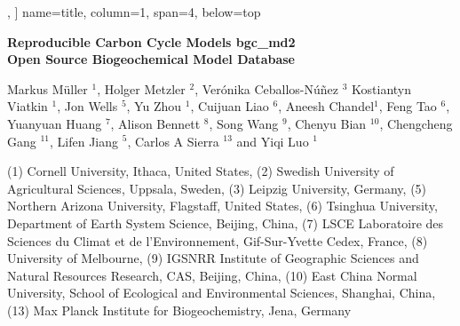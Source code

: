 \documentclass[36pt]{article}
\begin{document}
\begin{tcbposter}
{},
]{
name=title,
column=1,
span=4,
below=top}{
\resizebox*{!}{2cm}
{ \bfseries Reproducible Carbon Cycle Models bgc\_md2 }\\[6mm]
{ \bfseries Open Source Biogeochemical Model Database}\\[6mm]
\begin{minipage}{150cm}
\begin{center}
\small{
Markus Müller $^1$, 
Holger Metzler $^2$,
Ver\'onika Ceballos-N\'u\~nez $^3$
Kostiantyn Viatkin $^1$,
Jon Wells $^5$,
Yu Zhou $^1$,
Cuijuan Liao $^6$,
Aneesh Chandel$^1$,
Feng Tao $^6$,
Yuanyuan Huang $^7$,
Alison Bennett $^8$,
Song Wang $^9$,
Chenyu Bian $^{10}$,
Chengcheng Gang $^{11}$,
{Lifen Jiang $^{5}$},
Carlos A Sierra $^{13}$ and Yiqi Luo $^1$
}
\end{center}
\tiny{ 
(1) Cornell University, 
Ithaca, United States, 
(2) Swedish University of Agricultural Sciences, 
Uppsala, Sweden, 
(3) Leipzig University, 
Germany, 
(5) Northern Arizona University, 
Flagstaff, United States, 
(6) Tsinghua University, Department of Earth System Science, Beijing, China, 
(7) LSCE Laboratoire des Sciences du Climat et de l'Environnement, 
Gif-Sur-Yvette Cedex, France, 
(8) University of Melbourne, 
(9) IGSNRR Institute of Geographic Sciences and Natural Resources Research, CAS, 
Beijing, China, 
(10) East China Normal University, School of Ecological and Environmental Sciences, Shanghai, China, 
(13) Max Planck Institute for Biogeochemistry, 
Jena, Germany
}
\end{minipage}
}


\end{tcbposter}
\end{document}
